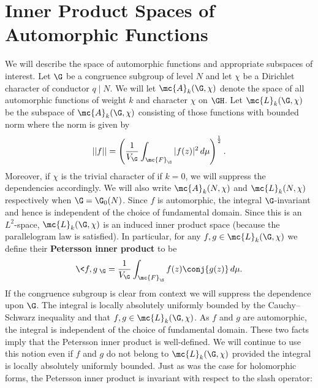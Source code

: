   \section{Inner Product Spaces of Automorphic Functions}
    We will describe the space of automorphic functions and appropriate subspaces of interest. Let $\G$ be a congruence subgroup of level $N$ and let $\chi$ be a Dirichlet character of conductor $q \mid N$. We will let $\mc{A}_{k}(\G,\chi)$ denote the space of all automorphic functions of weight $k$ and character $\chi$ on $\GH$. Let $\mc{L}_{k}(\G,\chi)$ be the subspace of $\mc{A}_{k}(\G,\chi)$ consisting of those functions with bounded norm where the norm is given by
    \[
      ||f|| = \left(\frac{1}{V_{\G}}\int_{\mc{F}_{\G}}|f(z)|^{2}\,d\mu\right)^{\frac{1}{2}}.
    \]
    Moreover, if $\chi$ is the trivial character of if $k = 0$, we will suppress the dependencies accordingly. We will also write $\mc{A}_{k}(N,\chi)$ and $\mc{L}_{k}(N,\chi)$ respectively when $\G = \G_{0}(N)$. Since $f$ is automorphic, the integral $\G$-invariant and hence is independent of the choice of fundamental domain. Since this is an $L^{2}$-space, $\mc{L}_{k}(\G,\chi)$ is an induced inner product space (because the parallelogram law is satisfied). In particular, for any $f,g \in \mc{L}_{k}(\G,\chi)$ we define their \textbf{Petersson inner product} to be
    \[
      \<f,g\>_{\G} = \frac{1}{V_{\G}}\int_{\mc{F}_{\G}}f(z)\conj{g(z)}\,d\mu.
    \]
    If the congruence subgroup is clear from context we will suppress the dependence upon $\G$. The integral is locally absolutely uniformly bounded by the Cauchy–Schwarz inequality and that $f,g \in \mc{L}_{k}(\G,\chi)$. As $f$ and $g$ are automorphic, the integral is independent of the choice of fundamental domain. These two facts imply that the Petersson inner product is well-defined. We will continue to use this notion even if $f$ and $g$ do not belong to $\mc{L}_{k}(\G,\chi)$ provided the integral is locally absolutely uniformly bounded. Just as was the case for holomorphic forms, the Petersson inner product is invariant with respect to the slash operator:

